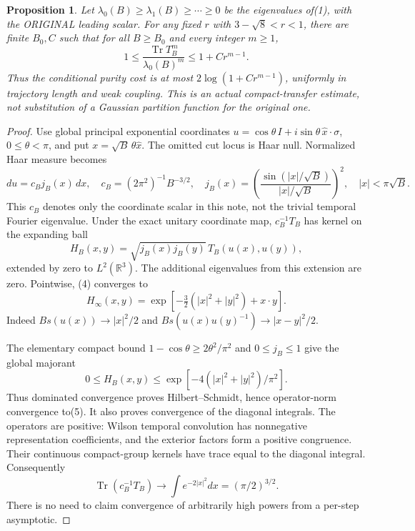 \documentclass{article}
\newtheorem{proposition}{Proposition}
\begin{document}
\begin{proposition}
Let $\lambda_0(B)\ge\lambda_1(B)\ge\cdots\ge0$ be the eigenvalues of(1), with the ORIGINAL leading scalar. For any fixed $r$ with $3-\sqrt8<r<1$, there are finite $B_0,C$ such that for all $B\ge B_0$ and every integer $m\ge1$,
\[
 1\le\frac{\operatorname{Tr}T_B^m}{\lambda_0(B)^m}
 \le1+C r^{m-1}.                                    \tag{2}
\]
Thus the conditional purity cost is at most $2\log(1+C r^{m-1})$, uniformly in trajectory length and weak coupling. This is an actual compact-transfer estimate, not substitution of a Gaussian partition function for the original one.
\end{proposition}
\begin{proof}
Use global principal exponential coordinates
$u=\cos\theta\,I+i\sin\theta\,\widehat x\cdot\sigma$, $0\le\theta<\pi$, and put $x=\sqrt B\,\theta\widehat x$. The omitted cut locus is Haar null. Normalized Haar measure becomes
\[
 du=c_B j_B(x)\,dx,\quad
 c_B=(2\pi^2)^{-1}B^{-3/2},\quad
 j_B(x)=\left(\frac{\sin(|x|/\sqrt B)}{|x|/\sqrt B}\right)^2,
 \quad |x|<\pi\sqrt B.                              \tag{3}
\]
This $c_B$ denotes only the coordinate scalar in this note, not the trivial temporal Fourier eigenvalue. Under the exact unitary coordinate map, $c_B^{-1}T_B$ has kernel on the expanding ball
\[
 H_B(x,y)=\sqrt{j_B(x)j_B(y)}\,T_B(u(x),u(y)),          \tag{4}
\]
extended by zero to $L^2(\mathbb R^3)$. The additional eigenvalues from this extension are zero. Pointwise, (4) converges to
\[
 H_\infty(x,y)=\exp[-\tfrac32(|x|^2+|y|^2)+x\cdot y].\tag{5}
\]
Indeed $Bs(u(x))\to|x|^2/2$ and $Bs(u(x)u(y)^{-1})\to|x-y|^2/2$.

The elementary compact bound $1-\cos\theta\ge2\theta^2/\pi^2$ and $0\le j_B\le1$ give the global majorant
\[
 0\le H_B(x,y)\le\exp[-4(|x|^2+|y|^2)/\pi^2].        \tag{6}
\]
Thus dominated convergence proves Hilbert--Schmidt, hence operator-norm convergence to(5). It also proves convergence of the diagonal integrals. The operators are positive: Wilson temporal convolution has nonnegative representation coefficients, and the exterior factors form a positive congruence. Their continuous compact-group kernels have trace equal to the diagonal integral. Consequently
\[
 \operatorname{Tr}(c_B^{-1}T_B)\longrightarrow
 \int e^{-2|x|^2}dx=(\pi/2)^{3/2}.                   \tag{7}
\]
There is no need to claim convergence of arbitrarily high powers from a per-step asymptotic.


\end{proof}
\end{document}
